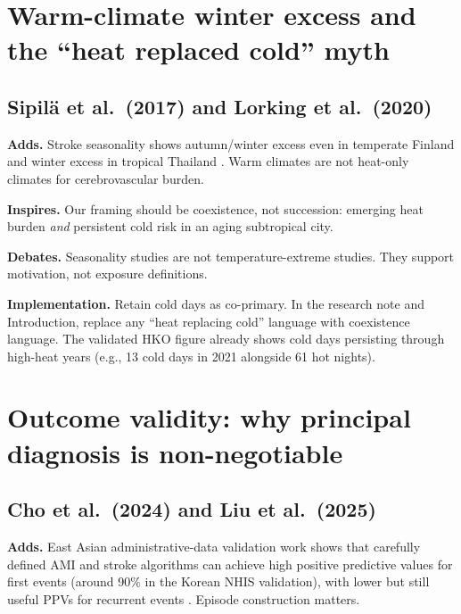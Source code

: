 \documentclass[11pt]{article}
\newcommand{\adds}{\textcolor{green!40!black}{\textbf{Adds.}}}
\newcommand{\inspires}{\textcolor{blue!55!black}{\textbf{Inspires.}}}
\newcommand{\debates}{\textcolor{orange!70!black}{\textbf{Debates.}}}
\newcommand{\impl}{\textcolor{purple!55!black}{\textbf{Implementation.}}}
\begin{document}
\section{Warm-climate winter excess and the ``heat replaced cold'' myth}

\subsection{Sipil{\"a} et al.\ (2017) and Lorking et al.\ (2020)}

\adds{} Stroke seasonality shows autumn/winter excess even in temperate Finland
\citep{sipila2017} and winter excess in tropical Thailand \citep{lorking2020}.
Warm climates are not heat-only climates for cerebrovascular burden.

\inspires{} Our framing should be coexistence, not succession: emerging heat
burden \emph{and} persistent cold risk in an aging subtropical city.

\debates{} Seasonality studies are not temperature-extreme studies. They support
motivation, not exposure definitions.

\impl{} Retain cold days as co-primary. In the research note and Introduction,
replace any ``heat replacing cold'' language with coexistence language. The
validated HKO figure already shows cold days persisting through high-heat years
(e.g., 13 cold days in 2021 alongside 61 hot nights).

\section{Outcome validity: why principal diagnosis is non-negotiable}

\subsection{Cho et al.\ (2024) and Liu et al.\ (2025)}

\adds{} East Asian administrative-data validation work shows that carefully defined
AMI and stroke algorithms can achieve high positive predictive values for first
events (around 90\% in the Korean NHIS validation), with lower but still useful
PPVs for recurrent events \citep{cho2024korea,liu2025tianjin}. Episode construction
matters.
\end{document}
